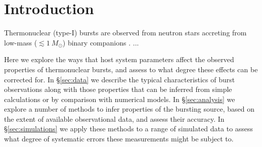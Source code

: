 \documentclass{aastex63}
\begin{document}

\section{Introduction} \label{sec:intro}

Thermonuclear (type-I) bursts are observed from neutron stars accreting from low-mass ($\lesssim 1\ M_\odot$) binary companions \cite[e.g.][]{gal17b}. ...

Here we explore the ways that host system  parameters affect the observed properties of thermonuclear bursts, and assess to what degree these effects can be corrected for.
%
In \S\ref{sec:data} we describe the typical characteristics of burst observations along with those properties that can be 
inferred from simple calculations or by comparison with numerical models.
% 
In \S\ref{sec:analysis} we explore a number of methods to infer properties of the bursting source, based on the extent of available observational data, and assess their accuracy.
%
In \S\ref{sec:simulations} we apply these methods to a range of simulated data to assess what degree of systematic errors these measurements might be subject to.
\end{document}
